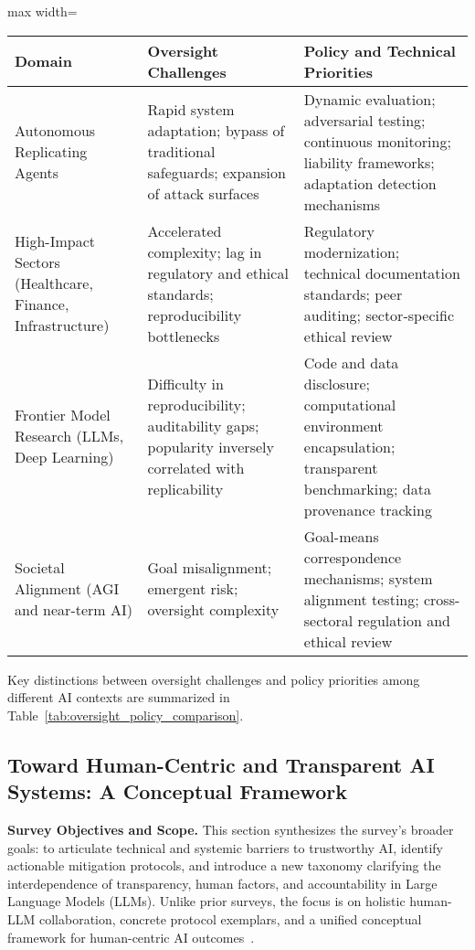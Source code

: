 \documentclass[sigconf]{acmart}
\begin{document}
\begin{table*}[htbp]
\centering
\caption{Comparison of Oversight Challenges and Policy Priorities in AI Deployment}
\label{tab:oversight_policy_comparison}
\begin{adjustbox}{max width=\textwidth}
\begin{tabular}{lll}
\toprule
\textbf{Domain} & \textbf{Oversight Challenges} & \textbf{Policy and Technical Priorities} \\
\midrule
Autonomous Replicating Agents & Rapid system adaptation; bypass of traditional safeguards; expansion of attack surfaces & Dynamic evaluation; adversarial testing; continuous monitoring; liability frameworks; adaptation detection mechanisms \\
High-Impact Sectors (Healthcare, Finance, Infrastructure) & Accelerated complexity; lag in regulatory and ethical standards; reproducibility bottlenecks & Regulatory modernization; technical documentation standards; peer auditing; sector-specific ethical review \\
Frontier Model Research (LLMs, Deep Learning) & Difficulty in reproducibility; auditability gaps; popularity inversely correlated with replicability & Code and data disclosure; computational environment encapsulation; transparent benchmarking; data provenance tracking \\
Societal Alignment (AGI and near-term AI) & Goal misalignment; emergent risk; oversight complexity & Goal-means correspondence mechanisms; system alignment testing; cross-sectoral regulation and ethical review  \\
\bottomrule
\end{tabular}
\end{adjustbox}
\end{table*}

Key distinctions between oversight challenges and policy priorities among different AI contexts are summarized in Table~\ref{tab:oversight_policy_comparison}.

\subsection{Toward Human-Centric and Transparent AI Systems: A Conceptual Framework}

\textbf{Survey Objectives and Scope.} This section synthesizes the survey’s broader goals: to articulate technical and systemic barriers to trustworthy AI, identify actionable mitigation protocols, and introduce a new taxonomy clarifying the interdependence of transparency, human factors, and accountability in Large Language Models (LLMs). Unlike prior surveys, the focus is on holistic human-LLM collaboration, concrete protocol exemplars, and a unified conceptual framework for human-centric AI outcomes~\cite{ref52,ref55}. 
\end{document}
